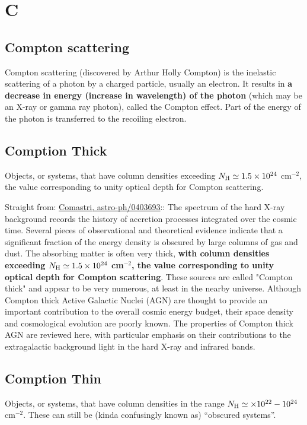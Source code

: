 \documentclass[11pt]{article}
\begin{document}
\section*{C}


\subsection*{Compton scattering} 
Compton scattering (discovered by Arthur Holly Compton) is the
inelastic scattering of a photon by a charged particle, usually an
electron. It results in {\bf a decrease in energy (increase in
wavelength) of the photon} (which may be an X-ray or gamma ray
photon), called the Compton effect. Part of the energy of the photon
is transferred to the recoiling electron. 

\subsection*{Comption Thick}
Objects, or systems, that have column densities exceeding $N_{\rm H}
\simeq 1.5 \times 10^{24}$ cm$^{-2}$, the value corresponding to unity
optical depth for Compton scattering.

Straight from: \href{http://ned.ipac.caltech.edu/level5/March04/Comastri/frames.html}{Comastri,  astro-ph/0403693}::
The spectrum of the hard X-ray background records the history of
accretion processes integrated over the cosmic time. Several pieces of
observational and theoretical evidence indicate that a significant
fraction of the energy density is obscured by large columns of gas and
dust. The absorbing matter is often very thick, {\bf with column
densities exceeding $N_{\rm H} \simeq 1.5 \times10^{24}$ cm$^{-2}$,
the value corresponding to unity optical depth for Compton
scattering}. These sources are called "Compton thick" and appear to be
very numerous, at least in the nearby universe. Although Compton thick
Active Galactic Nuclei (AGN) are thought to provide an important
contribution to the overall cosmic energy budget, their space density
and cosmological evolution are poorly known. The properties of Compton
thick AGN are reviewed here, with particular emphasis on their
contributions to the extragalactic background light in the hard X-ray
and infrared bands.

\subsection*{Comption Thin}
Objects, or systems, that have column densities in the range $N_{\rm H}
\simeq \times 10^{22} - 10^{24}$ cm$^{-2}$. These can still be 
(kinda confusingly known as) ``obscured systems''. 
\end{document}
